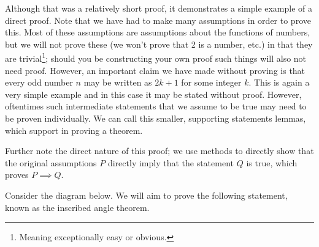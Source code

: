 Although that was a relatively short proof, it demonstrates a simple example of a direct proof. Note that we have had to make many assumptions in order to prove this. Most of these assumptions are assumptions about the functions of numbers, but we will not prove these (we won't prove that 2 is a number, etc.) in that they are trivial\footnote{Meaning exceptionally easy or obvious.}; should you be constructing your own proof such things will also not need proof. However, an important claim we have made without proving is that every odd number $n$ may be written as $2k+1$ for some integer $k$. This is again a very simple example and in this case it may be stated without proof. However, oftentimes such intermediate statements that we assume to be true may need to be proven individually. We can call this smaller, supporting statements lemmas, which support in proving a theorem.

Further note the direct nature of this proof; we use methods to directly show that the original assumptions $P$ directly imply that the statement $Q$ is true, which proves $P \implies Q$. 

Consider the diagram below. We will aim to prove the following statement, known as the inscribed angle theorem.

\begin{center}
\end{center}

